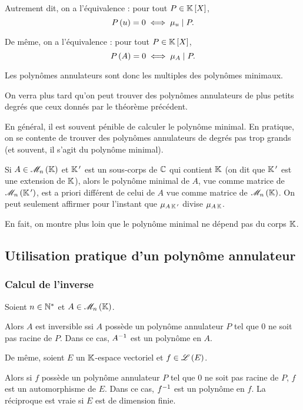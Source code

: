 Autrement dit, on a l'équivalence : pour tout \(P\in\poly\), \[P\left(u\right)=0\iff\mu_u\mid P.\]

De même, on a l'équivalence : pour tout \(P\in\poly\), \[P\left(A\right)=0\iff\mu_A\mid P.\]

Les polynômes annulateurs sont donc les multiples des polynômes minimaux.

On verra plus tard qu'on peut trouver des polynômes annulateurs de plus petits degrés que ceux donnés par le théorème précédent.

En général, il est souvent pénible de calculer le polynôme minimal. En pratique, on se contente de trouver des polynômes annulateurs de degrés pas trop grands (et souvent, il s'agit du polynôme minimal).

\begin{rem}
Si \(A\in\M{n}\) et \(\mathbb{K}^{\,\prime}\) est un sous-corps de \(\mathbb{C}\) qui contient \(\mathbb{K}\) (on dit que \(\mathbb{K}^{\,\prime}\) est une extension de \(\mathbb{K}\)), alors le polynôme minimal de \(A\), vue comme matrice de \(\M{n}[\K\prim]\), est a priori différent de celui de \(A\) vue comme matrice de \(\M{n}\). On peut seulement affirmer pour l'instant que \(\mu_{A\,\mathbb{K}^{\,\prime}}\) divise \(\mu_{A\,\mathbb{K}}\).

En fait, on montre plus loin que le polynôme minimal ne dépend pas du corps \(\mathbb{K}\).
\end{rem}

\subsection{Utilisation pratique d'un polynôme annulateur}

\subsubsection{Calcul de l'inverse}

\begin{prop}
Soient \(n\in\mathbb{N}^*\) et \(A\in\M{n}\).

Alors \(A\) est inversible ssi \(A\) possède un polynôme annulateur \(P\) tel que \(0\) ne soit pas racine de \(P\). Dans ce cas, \(A^{-1}\) est un polynôme en \(A\).

De même, soient \(E\) un \(\mathbb{K}\)-espace vectoriel et \(f\in\mathscr{L}\left(E\right)\).

Alors si \(f\) possède un polynôme annulateur \(P\) tel que \(0\) ne soit pas racine de \(P\), \(f\) est un automorphisme de \(E\). Dans ce cas, \(f^{-1}\) est un polynôme en \(f\). La réciproque est vraie si \(E\) est de dimension finie.
\end{prop}

